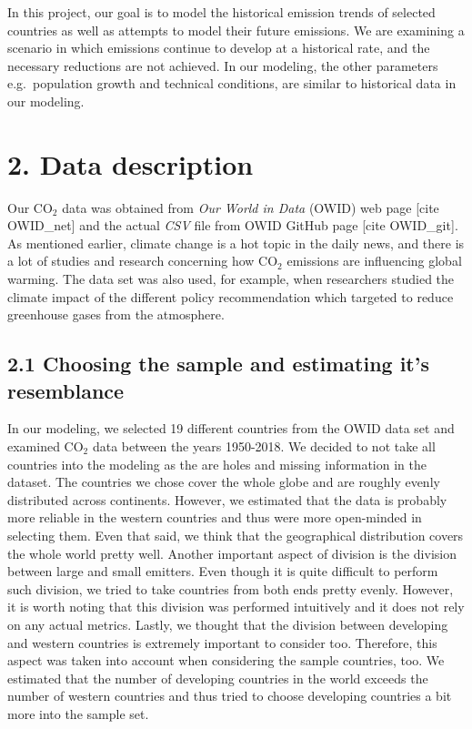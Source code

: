 \documentclass[
]{article}
\begin{document}
In this project, our goal is to model the historical emission trends of
selected countries as well as attempts to model their future emissions.
We are examining a scenario in which emissions continue to develop at a
historical rate, and the necessary reductions are not achieved. In our
modeling, the other parameters e.g.~population growth and technical
conditions, are similar to historical data in our modeling.

\hypertarget{data-description}{%
\section{2. Data description}\label{data-description}}

Our CO\(_2\) data was obtained from \textit{Our World in Data} (OWID)
web page {[}cite OWID\_net{]} and the actual \textit{CSV} file from OWID
GitHub page {[}cite OWID\_git{]}. As mentioned earlier, climate change
is a hot topic in the daily news, and there is a lot of studies and
research concerning how CO\(_2\) emissions are influencing global
warming. The data set was also used, for example, when researchers
studied the climate impact of the different policy recommendation which
targeted to reduce greenhouse gases from the atmosphere.

\hypertarget{choosing-the-sample-and-estimating-its-resemblance}{%
\subsection{2.1 Choosing the sample and estimating it's
resemblance}\label{choosing-the-sample-and-estimating-its-resemblance}}

In our modeling, we selected 19 different countries from the OWID data
set and examined CO\(_2\) data between the years 1950-2018. We decided
to not take all countries into the modeling as the are holes and missing
information in the dataset. The countries we chose cover the whole globe
and are roughly evenly distributed across continents. However, we
estimated that the data is probably more reliable in the western
countries and thus were more open-minded in selecting them. Even that
said, we think that the geographical distribution covers the whole world
pretty well. Another important aspect of division is the division
between large and small emitters. Even though it is quite difficult to
perform such division, we tried to take countries from both ends pretty
evenly. However, it is worth noting that this division was performed
intuitively and it does not rely on any actual metrics. Lastly, we
thought that the division between developing and western countries is
extremely important to consider too. Therefore, this aspect was taken
into account when considering the sample countries, too. We estimated
that the number of developing countries in the world exceeds the number
of western countries and thus tried to choose developing countries a bit
more into the sample set.
\end{document}
